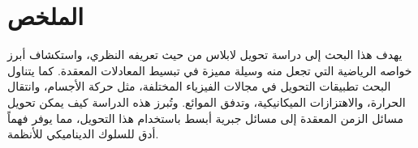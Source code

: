 \chapter*{الملخص}
يهدف هذا البحث إلى دراسة تحويل لابلاس من حيث تعريفه النظري، واستكشاف أبرز خواصه الرياضية التي تجعل منه وسيلة مميزة في تبسيط المعادلات المعقدة. كما يتناول البحث تطبيقات التحويل في مجالات الفيزياء المختلفة، مثل حركة الأجسام، وانتقال الحرارة، والاهتزازات الميكانيكية، وتدفق الموائع. وتُبرز هذه الدراسة كيف يمكن تحويل مسائل الزمن المعقدة إلى مسائل جبرية أبسط باستخدام هذا التحويل، مما يوفر فهماً أدق للسلوك الديناميكي للأنظمة.
